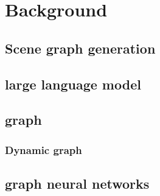 

\chapter{Background}\label{chapter:background}

\section{Scene graph generation}

\section{large language model}

\section{graph}

\subsection{Dynamic graph}

\section{graph neural networks}
